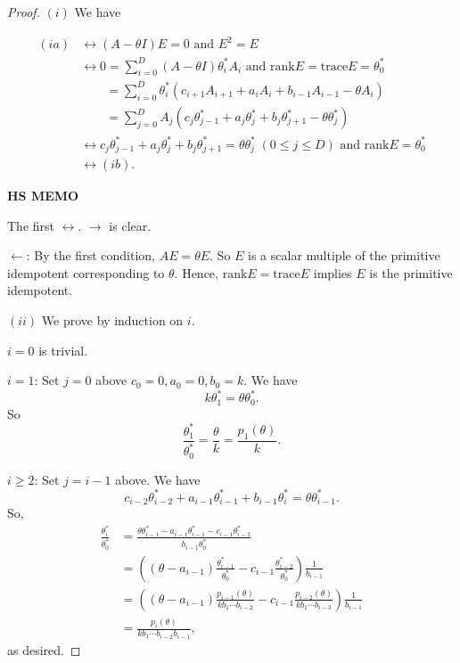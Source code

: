 \documentclass[
]{book}
\theoremstyle{definition}
\theoremstyle{definition}
\theoremstyle{definition}
\theoremstyle{definition}
\theoremstyle{remark}
\begin{document}
\begin{proof}
\leavevmode

\((i)\) We have

\begin{align}
(ia) & \leftrightarrow (A- \theta I)E = 0 \text{ and } E^2 = E\\
& \leftrightarrow 0 = \sum_{i=0}^D(A-\theta I)\theta^*_i A_i \text{ and $\mathrm{rank}E = \mathrm{trace}E = \theta^*_0$}\\
& \qquad = \sum_{i=0}^D\theta^*_i(c_{i+1}A_{i+1}+ a_iA_i + b_{i-1}A_{i-1}-\theta A_i)\\
& \qquad = \sum_{j=0}^D A_j(c_j\theta^*_{j-1}+a_j\theta^*_j+b_j\theta^*_{j+1}-\theta \theta^*_j)\\
& \leftrightarrow c_j \theta^*_{j-1} + a_j\theta^*_j + b_j\theta^*_{j+1} = \theta \theta^*_j \; (0\leq j \leq D) \text{ and }\mathrm{rank}E = \theta^*_0\\
& \leftrightarrow (ib).
\end{align}

\textbf{HS MEMO}

The first \(\leftrightarrow\). \(\rightarrow\) is clear.

\(\leftarrow\): By the first condition, \(AE = \theta E\). So \(E\) is a scalar multiple of the primitive idempotent corresponding to \(\theta\). Hence, \(\mathrm{rank}E = \mathrm{trace}E\) implies \(E\) is the primitive idempotent.

\((ii)\) We prove by induction on \(i\).

\(i = 0\) is trivial.

\(i=1\): Set \(j = 0\) above \(c_0 = 0, a_0 = 0, b_0 = k\). We have
\[k\theta^*_1 = \theta \theta^*_0.\]
So
\[\frac{\theta^*_1}{\theta^*_0} = \frac{\theta}{k} = \frac{p_1(\theta)}{k}.\]

\(i\geq 2\): Set \(j=i-1\) above. We have
\[c_{i-2}\theta^*_{i-2} + a_{i-1}\theta^*_{i-1} + b_{i-1}\theta^*_i = \theta \theta^*_{i-1}.\]
So,
\begin{align}
\frac{\theta^*_i}{\theta^*_0} & = \frac{\theta\theta^*_{i-1}-a_{i-1}\theta^*_{i-1}-c_{i-1}\theta^*_{i-2}}{b_{i-1}\theta^*_0}\\
& = \left((\theta-a_{i-1})\frac{\theta^*_{i-1}}{\theta^*_0}-c_{i-1}\frac{\theta^*_{i-2}}{\theta^*_0}\right)\frac{1}{b_{i-1}}\\
& = \left((\theta-a_{i-1})\frac{p_{i-1}(\theta)}{kb_1\cdots b_{i-2}}-c_{i-1}\frac{p_{i-2}(\theta)}{kb_1\cdots b_{i-3}}\right)\frac{1}{b_{i-1}}\\
& = \frac{p_i(\theta)}{kb_1\cdots b_{i-2}b_{i-1}},
\end{align}
as desired.

\end{proof}
\end{document}
